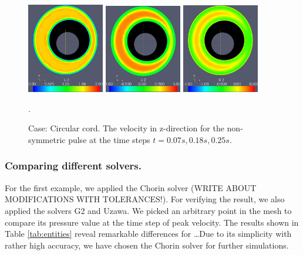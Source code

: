 \begin{figure}\begin{center}
\includegraphics[width=0.3\textwidth]{chapters/haughton/eps/pulse_f1_08_sysmax_nmb7.eps}
\includegraphics[width=0.3\textwidth]{chapters/haughton/eps/pulse_f1_08_sysdia_nmb18.eps}
\includegraphics[width=0.3\textwidth]{chapters/haughton/eps/pulse_f1_08_diamin1_nmb25.eps}
\caption{Case: Circular cord. The velocity in z-direction for the non-symmetric pulse at the time steps $t=0.07s, 0.18s, 0.25s$.}
\label{fig:case1}. 
\end{center}\end{figure}


\subsubsection{Comparing different solvers.}
For the first example, we applied the Chorin solver (WRITE ABOUT MODIFICATIONS WITH TOLERANCES!). For verifying the result, we also applied the solvers G2 and Uzawa. We picked an arbitrary point in the mesh to compare its pressure value at the time step of peak velocity. The results shown in Table \ref{tab:entities} reveal remarkable differences for \ldots Due to its simplicity with rather high accuracy, we have chosen the Chorin solver for further simulations.

